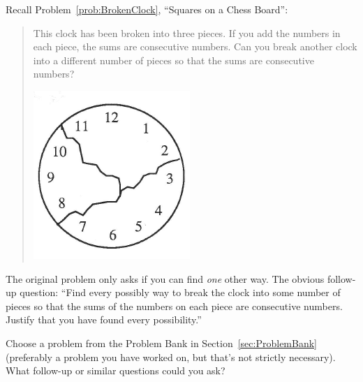 \begin{example}
Recall Problem~\ref{prob:BrokenClock}, ``Squares on a Chess Board'':

\begin{quote}
 This clock has been broken into three pieces.  If you add the numbers in each piece, the sums are consecutive numbers.  Can you break another clock into a different number of pieces so that the sums are consecutive numbers?  
 \begin{center}
\includegraphics[height=3 cm]{../Pictures/ProbSolvingPics/clock}
\end{center}

\end{quote}

The original problem only asks if you can find \emph{one} other way.  The obvious follow-up question: ``Find every possibly way to break the clock into some number of pieces so that the sums of the numbers on each piece are consecutive numbers.  Justify that you have found every possibility.'' 
\end{example}


\begin{thinkpair*}
Choose a problem from the Problem Bank in Section~\ref{sec:ProblemBank} (preferably a problem you have worked on, but that's not strictly necessary).  What follow-up or similar questions could you ask?

\end{thinkpair*}



  
